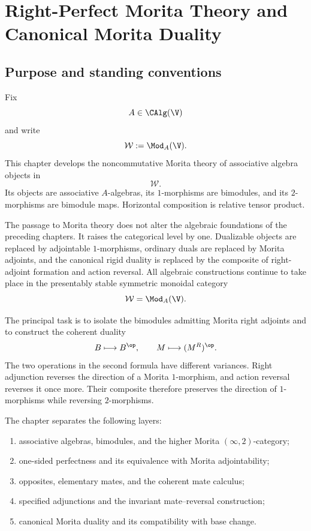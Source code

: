 \chapter{Right-Perfect Morita Theory and Canonical Morita Duality}
\label{chap:right-perfect-morita-duality}

\section{Purpose and standing conventions}
\label{sec:right-perfect-morita-purpose}

Fix
\[
    A\in\CAlg(\V)
\]
and write
\[
    \mathcal W
    :=
    \Mod_A(\V).
\]
This chapter develops the noncommutative Morita theory of associative
algebra objects in
\[
    \mathcal W.
\]
Its objects are associative $A$-algebras, its $1$-morphisms are
bimodules, and its $2$-morphisms are bimodule maps. Horizontal
composition is relative tensor product.

The passage to Morita theory does not alter the algebraic foundations of
the preceding chapters. It raises the categorical level by one.
Dualizable objects are replaced by adjointable $1$-morphisms, ordinary
duals are replaced by Morita adjoints, and the canonical rigid duality is
replaced by the composite of right-adjoint formation and action reversal.
All algebraic constructions continue to take place in the presentably
stable symmetric monoidal category
\[
    \mathcal W
    =
    \Mod_A(\V).
\]

The principal task is to isolate the bimodules admitting Morita right
adjoints and to construct the coherent duality
\[
    B\longmapsto B^{\op},
    \qquad
    M\longmapsto(M^R)^{\op}.
\]
The two operations in the second formula have different variances. Right
adjunction reverses the direction of a Morita $1$-morphism, and action
reversal reverses it once more. Their composite therefore preserves the
direction of $1$-morphisms while reversing $2$-morphisms.

The chapter separates the following layers:
\begin{enumerate}[label=(\roman*)]
    \item associative algebras, bimodules, and the higher Morita
    $(\infty,2)$-category;

    \item one-sided perfectness and its equivalence with Morita
    adjointability;

    \item opposites, elementary mates, and the coherent mate calculus;

    \item specified adjunctions and the invariant mate--reversal
    construction;

    \item canonical Morita duality and its compatibility with base
    change.
\end{enumerate}

